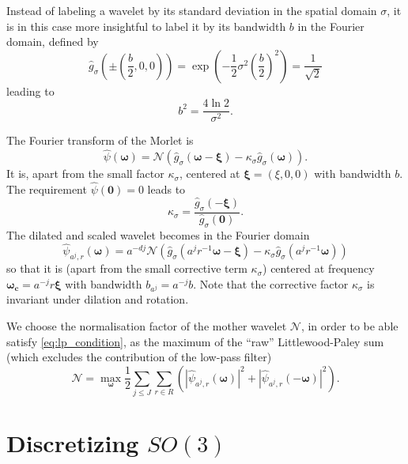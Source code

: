 \documentclass[twocolumn, openany, oneside, article]{memoir}
\begin{document}
Instead of labeling a wavelet by its standard deviation in the spatial domain $\sigma$, it is in this case
more insightful to label it by its bandwidth $b$ in the Fourier domain, defined by
\begin{equation}
  \hat{g}_{\sigma}\left(\pm \left(\frac{b}{2}, 0, 0 \right) \right) = \exp \left( -\frac{1}{2}\sigma^2 \left(\frac{b}{2}\right)^2 \right) = \frac{1}{\sqrt{2}}
\end{equation}
leading to
\begin{equation}
  b^2 = \frac{4 \ln 2}{\sigma^2}.
\end{equation}

The Fourier transform of the Morlet is
\begin{equation}
  \hat{\psi}(\bm{\omega}) = \mathcal{N} \left( \hat{g}_{\sigma}(\bm{\omega} - \bm{\xi}) -
  \kappa_{\sigma}\hat{g}_{\sigma}(\bm{\omega}) \right) .
\end{equation}
It is, apart from the small factor $\kappa_{\sigma}$, centered at
$\bm{\xi} = (\xi, 0, 0)$ with bandwidth $b$.
The requirement $\hat{\psi}(\bm{0}) = 0$ leads to
\begin{equation}
  \kappa_{\sigma} = \frac{\hat{g}_{\sigma}(-\bm{\xi})}{\hat{g}_{\sigma}(\bm{0})}.
\end{equation}
The dilated and scaled wavelet becomes in the Fourier domain
\begin{equation}
  \hat{\psi}_{a^j, r}(\bm{\omega}) = a^{-dj} \mathcal{N} \left( \hat{g}_{\sigma}(a^j r^{-1} \bm{\omega} - \bm{\xi}) - \kappa_{\sigma}\hat{g}_{\sigma}(a^j r^{-1} \bm{\omega}) \right)
\end{equation}
so that it is (apart from the small corrective term $\kappa_{\sigma}$) centered at frequency $\bm{\omega_c} =
a^{-j}r\bm{\xi}$ with bandwidth $b_{a^j} = a^{-j}b$. Note that the corrective factor $\kappa_{\sigma}$ is invariant
under dilation and rotation.

We choose the normalisation factor of the mother wavelet $\mathcal{N}$,
in order to be able satisfy \autoref{eq:lp_condition}, as the maximum of the \enquote{raw} Littlewood-Paley
sum (which excludes the contribution of the low-pass filter)
\begin{equation}
  \mathcal{N} = \max_{\bm{\omega}} \frac{1}{2} \sum_{j \leq J} \sum_{r \in R}
  \left( \left| \hat{\psi}_{a^j, r}(\bm{\omega}) \right|^2 + \left| \hat{\psi}_{a^j, r}(\bm{-\omega}) \right|^2
  \right).
\end{equation}


\section{Discretizing $SO(3)$}
\end{document}
